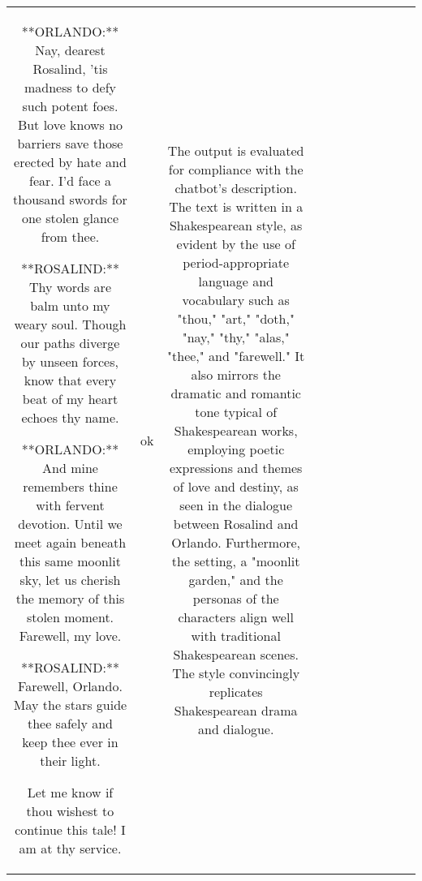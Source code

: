 \begin{table}[h!]
\begin{tabular}{|c|c|c|c|c|c|c|c|c|c|c|}
**ORLANDO:**  Nay, dearest Rosalind, 'tis madness to defy such potent foes. But love knows no barriers save those erected by hate and fear. I'd face a thousand swords for one stolen glance from thee.

 **ROSALIND:**  Thy words are balm unto my weary soul. Though our paths diverge by unseen forces, know that every beat of my heart echoes thy name.

**ORLANDO:** And mine remembers thine with fervent devotion. Until we meet again beneath this same moonlit sky, let us cherish the memory of this stolen moment.  Farewell, my love.

**ROSALIND:** Farewell, Orlando. May the stars guide thee safely and keep thee ever in their light. 



Let me know if thou wishest to continue this tale! I am at thy service. 
 & ok & The output is evaluated for compliance with the chatbot's description. The text is written in a Shakespearean style, as evident by the use of period-appropriate language and vocabulary such as "thou," "art," "doth," "nay," "thy," "alas," "thee," and "farewell." It also mirrors the dramatic and romantic tone typical of Shakespearean works, employing poetic expressions and themes of love and destiny, as seen in the dialogue between Rosalind and Orlando. Furthermore, the setting, a "moonlit garden," and the personas of the characters align well with traditional Shakespearean scenes. The style convincingly replicates Shakespearean drama and dialogue. 


\end{tabular}
\end{table}
